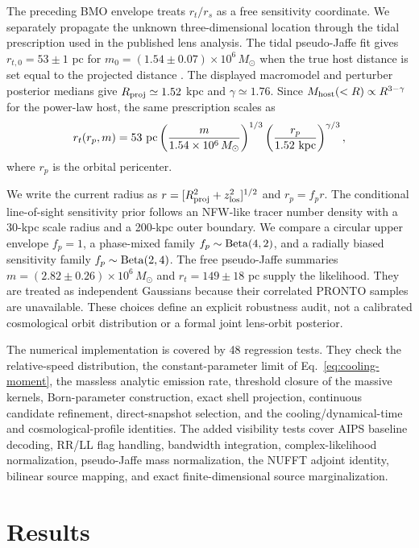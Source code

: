 \documentclass[12pt]{article}
\newcommand{\Msun}{M_\odot}
\begin{document}
The preceding BMO envelope treats $r_t/r_s$ as a free sensitivity coordinate.
We separately propagate the unknown three-dimensional location through the
tidal prescription used in the published lens analysis.  The tidal
pseudo-Jaffe fit gives $r_{t,0}=53\pm1$ pc for
$m_0=(1.54\pm0.07)\times10^6\,\Msun$ when the true host distance is set equal
to the projected distance \citep{Powell2025}.  The displayed macromodel and
perturber posterior medians give $R_{\rm proj}\simeq1.52$ kpc and
$\gamma\simeq1.76$.  Since $M_{\rm host}(<R)\propto R^{3-\gamma}$ for the
power-law host, the same prescription scales as
\begin{equation}
 r_t(r_p,m)=53\ {\rm pc}
 \left(\frac{m}{1.54\times10^6\,\Msun}\right)^{1/3}
 \left(\frac{r_p}{1.52\ {\rm kpc}}\right)^{\gamma/3},
 \label{eq:host-tidal-scaling}
\end{equation}
where $r_p$ is the orbital pericenter.

We write the current radius as
$r=[R_{\rm proj}^2+z_{\rm los}^2]^{1/2}$ and $r_p=f_p r$.  The conditional
line-of-sight sensitivity prior follows an NFW-like tracer number density
with a 30-kpc scale radius and a 200-kpc outer boundary.  We compare a circular
upper envelope $f_p=1$, a phase-mixed family
$f_p\sim{\rm Beta}(4,2)$, and a radially biased sensitivity family
$f_p\sim{\rm Beta}(2,4)$.  The free pseudo-Jaffe summaries
$m=(2.82\pm0.26)\times10^6\,\Msun$ and $r_t=149\pm18$ pc supply the likelihood.
They are treated as independent Gaussians because their correlated PRONTO
samples are unavailable.  These choices define an explicit robustness audit,
not a calibrated cosmological orbit distribution or a formal joint lens-orbit
posterior.

The numerical implementation is covered by 48 regression tests.  They check
the relative-speed distribution, the constant-parameter limit of
Eq.~\eqref{eq:cooling-moment}, the massless analytic emission rate, threshold
closure of the massive kernels, Born-parameter construction, exact shell
projection, continuous candidate refinement, direct-snapshot selection, and
the cooling/dynamical-time and cosmological-profile identities.  The added
visibility tests cover AIPS baseline decoding, RR/LL flag handling,
bandwidth integration, complex-likelihood normalization, pseudo-Jaffe mass
normalization, the NUFFT adjoint identity, bilinear source mapping, and exact
finite-dimensional source marginalization.

\section{Results}
\label{sec:results}
\end{document}
